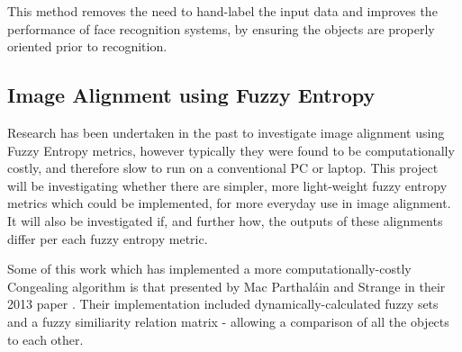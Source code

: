 This method removes the need to hand-label the input data and improves the performance of face recognition systems, by ensuring the objects are properly oriented prior to recognition.

\subsection{Image Alignment using Fuzzy Entropy}

Research has been undertaken in the past to investigate image alignment using Fuzzy Entropy metrics, however typically they were found to be computationally costly, and therefore slow to run on a conventional PC or laptop. This project will be investigating whether there are simpler, more light-weight fuzzy entropy metrics which could be implemented, for more everyday use in image alignment. It will also be investigated if, and further how, the outputs of these alignments differ per each fuzzy entropy metric.

Some of this work which has implemented a more computationally-costly \Gls{Congealing} algorithm is that presented by Mac Parthal\'ain and Strange in their 2013 paper  \cite{Mac_Parthalain_Strange_2013}.  Their implementation included dynamically-calculated fuzzy sets and a fuzzy similiarity relation matrix - allowing a comparison of all the objects to each other.
